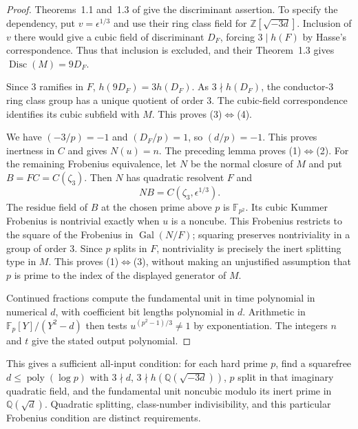 \documentclass[11pt]{article}
\theoremstyle{definition}
\theoremstyle{remark}
\begin{document}
\begin{proof}
Theorems~1.1 and~1.3 of \cite{EvansEtAl2025Hasse}
give the discriminant assertion.  To specify the dependency,
put $v=\epsilon^{1/3}$ and use their ring class field for
$\mathbb Z[\sqrt{-3d}]$.  Inclusion of $v$ there would
give a cubic field of discriminant $D_F$, forcing
$3\mid h(F)$ by Hasse's correspondence.  Thus that
inclusion is excluded, and their Theorem~1.3 gives
$\operatorname{Disc}(M)=9D_F$.

Since $3$ ramifies in $F$,
$h(9D_F)=3h(D_F)$.  As $3\nmid h(D_F)$, the
conductor-$3$ ring class group has a unique quotient of
order $3$.  The cubic-field correspondence identifies
its cubic subfield with $M$.  This proves (3)$\Leftrightarrow$(4).

We have $(-3/p)=-1$ and $(D_F/p)=1$, so $(d/p)=-1$.
This proves inertness in $C$ and gives $N(u)=n$.
The preceding lemma proves (1)$\Leftrightarrow$(2).
For the remaining Frobenius equivalence, let $N$ be the
normal closure of $M$ and put $B=FC=C(\zeta_3)$.
Then $N$ has quadratic resolvent $F$ and
\[
 NB=C(\zeta_3,\epsilon^{1/3}).
\]
The residue field of $B$ at the chosen prime above $p$
is $\mathbb F_{p^2}$.  Its cubic Kummer Frobenius is
nontrivial exactly when $u$ is a noncube.  This Frobenius
restricts to the square of the Frobenius in
$\operatorname{Gal}(N/F)$; squaring preserves nontriviality
in a group of order $3$.  Since $p$ splits in $F$,
nontriviality is precisely the inert splitting type in $M$.
This proves (1)$\Leftrightarrow$(3), without making an
unjustified assumption that $p$ is prime to the index of
the displayed generator of $M$.

Continued fractions compute the fundamental unit in time
polynomial in numerical $d$, with coefficient bit lengths
polynomial in $d$.  Arithmetic in
$\mathbb F_p[Y]/(Y^2-d)$ then tests
$u^{(p^2-1)/3}\ne1$ by exponentiation.  The integers
$n$ and $t$ give the stated output polynomial.
\end{proof}

This gives a sufficient all-input condition: for each hard
prime $p$, find a squarefree $d\le\operatorname{poly}(\log p)$
with $3\nmid d$, $3\nmid h(\mathbb Q(\sqrt{-3d}))$,
$p$ split in that imaginary quadratic field, and the
fundamental unit noncubic modulo its inert prime in
$\mathbb Q(\sqrt d)$.  Quadratic splitting, class-number
indivisibility, and this particular Frobenius condition
are distinct requirements.
\end{document}
